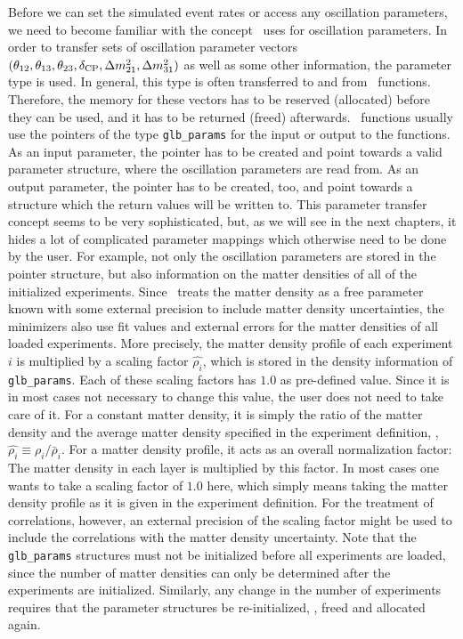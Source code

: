 Before we can set the simulated event rates or access any oscillation
parameters, we need to become familiar with the concept \GLOBES\ uses
for oscillation parameters. In order to transfer sets of oscillation
parameter vectors $(\theta_{12}, \theta_{13}, \theta_{23}, \delta_{\mathrm{CP}}, \Delta m_{21}^2, \Delta m_{31}^2)$
as well as some other information, the parameter type  is used. In general,
 this type is often
transferred to and from \GLOBES\ functions. Therefore, the memory 
for these vectors has to be reserved (allocated) before they can be used, 
and it has
to be returned (freed) afterwards. \GLOBES\ functions usually use the pointers
of the type {\tt glb\_params} for the input or output to the functions. As
an input parameter, the pointer has to be created and point towards a valid
parameter structure, where the oscillation parameters are read from. As
an output parameter, the pointer has to be created, too, and point towards
a structure which the return values will be written to.
This parameter transfer concept seems to be very sophisticated, but, as we
will see in the next chapters, it hides a lot of complicated parameter 
mappings which otherwise need to be done by the user. For example, not
only the oscillation parameters are stored in the pointer structure, but also information on the matter
densities of all of the initialized experiments. Since \GLOBES\ treats
the matter density as a free parameter known with some external precision
to include matter density uncertainties,
the minimizers also use fit values and external errors for the matter
densities of all loaded experiments. More precisely, the matter density
profile of each experiment $i$ is multiplied by a scaling factor
$\hat{\rho_i}$, 
which is stored in the density information of {\tt glb\_params}. 
Each of
these scaling factors has $1.0$ as pre-defined value. Since it
is in most cases not necessary to change this value, the user does
not need to take care of it. For a constant matter density, it is simply the ratio of the matter density and the average matter density specified in the experiment definition, \ie , $\hat{\rho_i} \equiv \rho_i/\bar{\rho}_i$. For a matter density profile, it acts as an overall normalization factor: The matter density in each layer is multiplied by this factor. In most cases one wants to take a scaling factor of $1.0$ here, which simply means taking the matter density profile as it is given in the experiment definition. For the treatment of correlations, however,
an external precision of the scaling factor might be used to include the
correlations with the matter density uncertainty.
Note that the {\tt glb\_params}
structures must not be initialized before all experiments are loaded,
since the number of matter densities can only be determined after the
experiments are initialized. 
Similarly, any change in the number of experiments requires that the
parameter structures be re-initialized, \ie, freed and allocated again.



